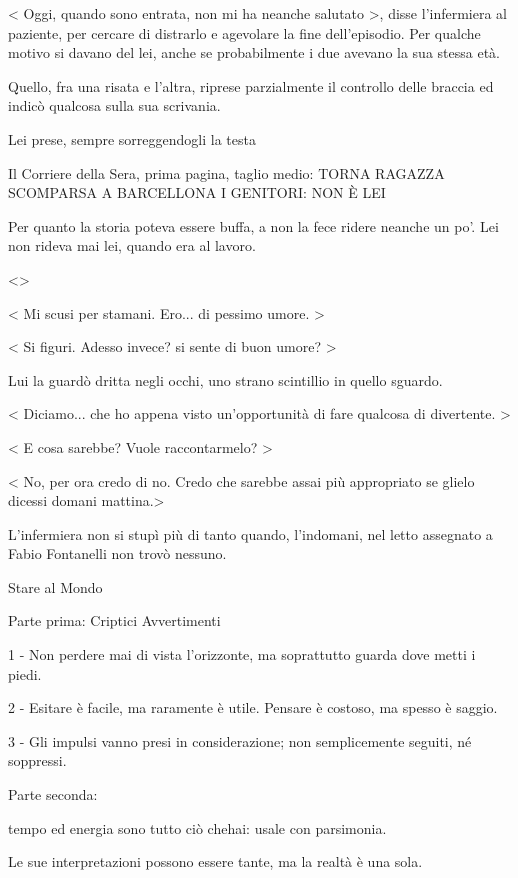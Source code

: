 < Oggi, quando sono entrata, non mi ha neanche salutato >, disse l'infermiera al paziente, per cercare di distrarlo e agevolare la fine dell'episodio. Per qualche motivo si davano del lei, anche se probabilmente i due avevano la sua stessa età.

Quello, fra una risata e l'altra, riprese parzialmente il controllo delle braccia ed indicò qualcosa sulla sua scrivania.

Lei prese, sempre sorreggendogli la testa

Il Corriere della Sera, prima pagina, taglio medio:
TORNA RAGAZZA SCOMPARSA A BARCELLONA
I GENITORI: NON È LEI

Per quanto la storia poteva essere buffa, a non la fece ridere neanche un po'. Lei non rideva mai lei, quando era al lavoro.

<>

< Mi scusi per stamani. Ero... di pessimo umore. >

< Si figuri. Adesso invece? si sente di buon umore? >

Lui la guardò dritta negli occhi, uno strano scintillio in quello sguardo.

< Diciamo... che ho appena visto un'opportunità di fare qualcosa di divertente. >

< E cosa sarebbe? Vuole raccontarmelo? >

< No, per ora credo di no. Credo che sarebbe assai più appropriato se glielo dicessi domani mattina.>

L'infermiera non si stupì più di tanto quando, l'indomani, nel letto assegnato a Fabio Fontanelli non trovò nessuno.









Stare al Mondo

Parte prima: Criptici Avvertimenti

1 - Non perdere mai di vista l’orizzonte, ma soprattutto guarda dove metti i piedi.

2 - Esitare è facile, ma raramente è utile. Pensare è costoso, ma spesso è saggio.

3 - Gli impulsi vanno presi in considerazione; non semplicemente seguiti, né soppressi.

Parte seconda: 

tempo ed energia sono tutto ciò chehai: usale con parsimonia.

Le sue interpretazioni possono essere tante, ma la realtà è una sola.

